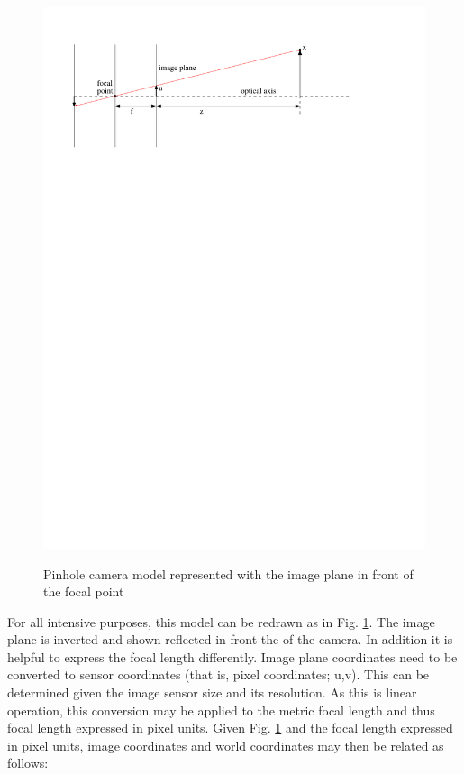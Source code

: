 \begin{figure}[h]
  \centering
    \includegraphics[width=1.0\textwidth]{chapters/images/pinhole_cam_2} \\
  \caption{Pinhole camera model represented with the image plane in front of the focal point}
  \label{fig:pinhole_normal}
\end{figure}

For all intensive purposes, this model can be redrawn as in Fig. \ref{fig:pinhole_normal}. The image plane is inverted and shown reflected in front the of the camera.  In addition it is helpful to express the focal length differently.  Image plane coordinates need to be converted to sensor coordinates (that is, pixel coordinates; u,v).  This can be determined given the image sensor size and its resolution.  As this is linear operation, this conversion may be applied to the metric focal length and thus focal length expressed in pixel units.  Given Fig. \ref{fig:pinhole_normal} and the focal length expressed in pixel units, image coordinates and world coordinates may then be related as follows: 

